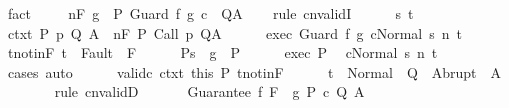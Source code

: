\begin{isabellebody}
\ fact\isanewline
\ \ \isamarkupfalse%
\ {\isachardoublequoteopen}{\isasymGamma}{\isacharcomma}{\isasymTheta}\ {\isasymTurnstile}n{\isacharcolon}\isactrlbsub {\isacharslash}F\isactrlesub \ {\isacharparenleft}g\ {\isasyminter}\ P{\isacharparenright}\ Guard\ f\ g\ c\ \ Q{\isacharcomma}A{\isachardoublequoteclose}\isanewline
\ \ \isamarkupfalse%
\ {\isacharparenleft}rule\ cnvalidI{\isacharparenright}\isanewline
\ \ \ \ \isamarkupfalse%
\ s\ t\isanewline
\ \ \ \ \isamarkupfalse%
\ ctxt{\isacharcolon}\ {\isachardoublequoteopen}{\isasymforall}{\isacharparenleft}P{\isacharcomma}\ p{\isacharcomma}\ Q{\isacharcomma}\ A{\isacharparenright}{\isasymin}{\isasymTheta}{\isachardot}\ {\isasymGamma}\ {\isasymTurnstile}n{\isacharcolon}\isactrlbsub {\isacharslash}F\isactrlesub \ P\ {\isacharparenleft}Call\ p{\isacharparenright}\ Q{\isacharcomma}A{\isachardoublequoteclose}\isanewline
\ \ \ \ \isamarkupfalse%
\ exec{\isacharcolon}\ {\isachardoublequoteopen}{\isasymGamma}{\isasymturnstile}{\isasymlangle}Guard\ f\ g\ c{\isacharcomma}Normal\ s{\isasymrangle}\ {\isacharequal}n{\isasymRightarrow}\ t{\isachardoublequoteclose}\isanewline
\ \ \ \ \isamarkupfalse%
\ t{\isacharunderscore}notin{\isacharunderscore}F{\isacharcolon}\ {\isachardoublequoteopen}t\ {\isasymnotin}\ Fault\ {\isacharbackquote}\ F{\isachardoublequoteclose}\isanewline
\ \ \ \ \isamarkupfalse%
\ P{\isacharcolon}{\isachardoublequoteopen}s\ {\isasymin}\ {\isacharparenleft}g\ {\isasyminter}\ P{\isacharparenright}{\isachardoublequoteclose}\isanewline
\ \ \ \ \isamarkupfalse%
\ exec\ P\ \isamarkupfalse%
\ {\isachardoublequoteopen}{\isasymGamma}{\isasymturnstile}{\isasymlangle}c{\isacharcomma}Normal\ s{\isasymrangle}\ {\isacharequal}n{\isasymRightarrow}\ t{\isachardoublequoteclose}\isanewline
\ \ \ \ \ \ \isamarkupfalse%
\ cases\ auto\isanewline
\ \ \ \ \isamarkupfalse%
\ valid{\isacharunderscore}c\ ctxt\ this\ P\ t{\isacharunderscore}notin{\isacharunderscore}F\isanewline
\ \ \ \ \isamarkupfalse%
\ {\isachardoublequoteopen}t\ {\isasymin}\ Normal\ {\isacharbackquote}\ Q\ {\isasymunion}\ Abrupt\ {\isacharbackquote}\ A{\isachardoublequoteclose}\isanewline
\ \ \ \ \ \ \isamarkupfalse%
\ {\isacharparenleft}rule\ cnvalidD{\isacharparenright}\isanewline
\ \ \isamarkupfalse%
\isanewline
{}\isamarkupfalse%
\isanewline
\ \ \isamarkupfalse%
\ {\isacharparenleft}Guarantee\ f\ F\ {\isasymTheta}\ g\ P\ c\ Q\ A{\isacharparenright}\isanewline

\end{isabellebody}
